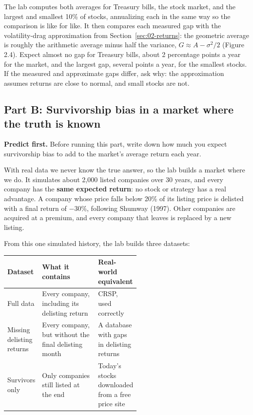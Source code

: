 The lab computes both averages for Treasury bills, the stock market, and the
largest and smallest 10\% of stocks, annualizing each in the same way so the
comparison is like for like. It then compares each measured gap with the
volatility-drag approximation from Section~\ref{sec:02-returns}: the geometric
average is roughly the arithmetic average minus half the variance,
$G \approx A - \sigma^2/2$ (Figure 2.4). Expect almost no gap for Treasury
bills, about 2 percentage points a year for the market, and the largest gap,
several points a year, for the smallest stocks. If the measured and approximate
gaps differ, ask why: the approximation assumes returns are close to normal,
and small stocks are not.

\subsection*{Part B: Survivorship bias in a market where the truth is known}

\textbf{Predict first.} Before running this part, write down how much you
expect survivorship bias to add to the market's average return each year.

With real data we never know the true answer, so the lab builds a market where
we do. It simulates about 2,000 listed companies over 30 years, and every
company has the \textbf{same expected return}: no stock or strategy has a real
advantage. A company whose price falls below 20\% of its listing price is
delisted with a final return of $-30$\%, following Shumway (1997). Other
companies are acquired at a premium, and every company that leaves is replaced
by a new listing.

From this one simulated history, the lab builds three datasets:

\begin{center}
\small
\begin{tabularx}{0.9\linewidth}{@{}>{\raggedright\arraybackslash}p{0.26\linewidth}>{\raggedright\arraybackslash}X>{\raggedright\arraybackslash}p{0.28\linewidth}@{}}
\toprule
Dataset & What it contains & Real-world equivalent \\
\midrule
Full data & Every company, including its delisting return & CRSP, used correctly \\
Missing delisting returns & Every company, but without the final delisting month & A database with gaps in delisting returns \\
Survivors only & Only companies still listed at the end & Today's stocks downloaded from a free price site \\
\bottomrule
\end{tabularx}
\end{center}


